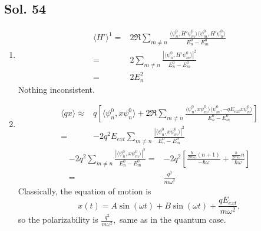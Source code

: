 \subsection*{Sol. 54}
\begin{enumerate}
    \item 
    \begin{align*}
        \langle H'\rangle^1
        =&2\Re 
        \sum_{m\neq n}
        \frac{
        \langle\psi^0_n, H'\psi^0_m\rangle
        \langle\psi^0_m, H'\psi^0_n\rangle
        }{E^0_n-E^0_m}\\
        =&
        2
        \sum_{m\neq n}
        \frac{
        |\langle\psi^0_n, H'\psi^0_m\rangle|^2
        }{E^0_n-E^0_m}
        \\
        =&2E_n^2
    \end{align*}
    Nothing inconsistent.
    \item 
    \begin{align*}
        \langle qx\rangle
        \approx& 
        q\left[
        \langle \psi_n^0,x\psi_n^0\rangle
        +
        2\Re\sum_{m\neq n}
        \frac{\langle\psi_n^0,x\psi_m^0\rangle
        \langle\psi_m^0,-qE_{ext} x\psi_n^0\rangle}{E_n^0-E_m^0}
        \right]\\
        =&
        -2q^2E_{ext}
        \sum_{m\neq n}
        \frac{|\langle\psi_n^0,x\psi_m^0\rangle|^2
        }{E_n^0-E_m^0}
    \end{align*}
    \begin{align*}
        -2q^2
        \sum_{m\neq n}
        \frac{|\langle\psi_n^0,x\psi_m^0\rangle|^2
        }{E_n^0-E_m^0}=&
        -2q^2\left[
        \frac{\frac{\hbar}{2m\omega}(n+1)}{-\hbar\omega}
        +
        \frac{\frac{\hbar}{2m\omega}n}{\hbar\omega}
        \right]\\
        =&
        \frac{q^2}{m\omega^2}
    \end{align*}
    Classically, 
    the equation of motion is 
    $$
    x(t)=A\sin(\omega t) + B\sin(\omega t) +\frac{qE_{ext}}{m\omega^2},
    $$
    so the polarizability is 
    $
    \frac{q^2}{m\omega^2},
    $
    same as in the quantum case.


\end{enumerate}
